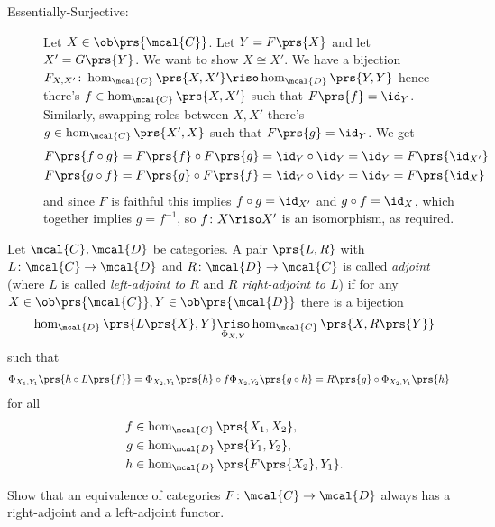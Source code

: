 \documentclass[10pt]{article}
\begin{document}
\begin{solution}
\begin{description}
\begin{description}
\item[Essentially-Surjective:]
Let $X \in \ob\prs{\mcal{C}}$. Let $Y = F\prs{X}$ and let $X' = G\prs{Y}$. We want to show $X \cong X'$.
We have a bijection $F_{X,X'} \colon \hom_{\mcal{C}}\prs{X,X'} \riso \hom_{\mcal{D}}\prs{Y,Y}$ hence there's $f \in \hom_{\mcal{C}}\prs{X,X'}$ such that $F\prs{f} = \id_Y$. Similarly, swapping roles between $X,X'$ there's $g \in \hom_{\mcal{C}}\prs{X',X}$ such that $F\prs{g} = \id_Y$. We get
\begin{align*}
F\prs{f \circ g} &= F\prs{f} \circ F\prs{g} = \id_Y \circ \id_Y = \id_Y = F\prs{\id_{X'}} \\
F\prs{g \circ f} &= F\prs{g} \circ F\prs{f} = \id_Y \circ \id_Y = \id_Y = F\prs{\id_{X}}
\end{align*}
and since $F$ is faithful this implies $f \circ g = \id_{X'}$ and $g \circ f = \id_X$, which together implies $g = f^{-1}$, so $f \colon X \riso X'$ is an isomorphism, as required.
\end{description}
\end{description}
\end{solution}

\begin{exercise} \label{exercise:adjoint_equivalence} %
Let $\mcal{C}, \mcal{D}$ be categories. A pair $\prs{L,R}$ with $L \colon \mcal{C} \to \mcal{D}$ and $R \colon \mcal{D} \to \mcal{C}$ is called \emph{adjoint} (where $L$ is called \emph{left-adjoint to $R$} and $R$ \emph{right-adjoint to $L$}) if for any $X \in \ob\prs{\mcal{C}}, Y \in \ob\prs{\mcal{D}}$ there is a bijection
\[\hom_{\mcal{D}} \prs{L\prs{X}, Y} \underset{\Phi_{X,Y}}{\riso} \hom_{\mcal{C}}\prs{X, R\prs{Y}}\]
such that
\begin{align*}
\Phi_{X_1, Y_1}\prs{h \circ L\prs{f}} &= \Phi_{X_2, Y_1}\prs{h} \circ f
\Phi_{X_2, Y_2}\prs{g \circ h} = R\prs{g} \circ \Phi_{X_2, Y_1}\prs{h}
\end{align*}
for all
\begin{align*}
f &\in \hom_{\mcal{C}}\prs{X_1, X_2},\\
g &\in \hom_{\mcal{D}}\prs{Y_1, Y_2},\\
h &\in \hom_{\mcal{D}}\prs{F\prs{X_2}, Y_1} \text{.}
\end{align*}

Show that an equivalence of categories $F \colon \mcal{C} \to \mcal{D}$ always has a right-adjoint and a left-adjoint functor.
\end{exercise}
\end{document}
